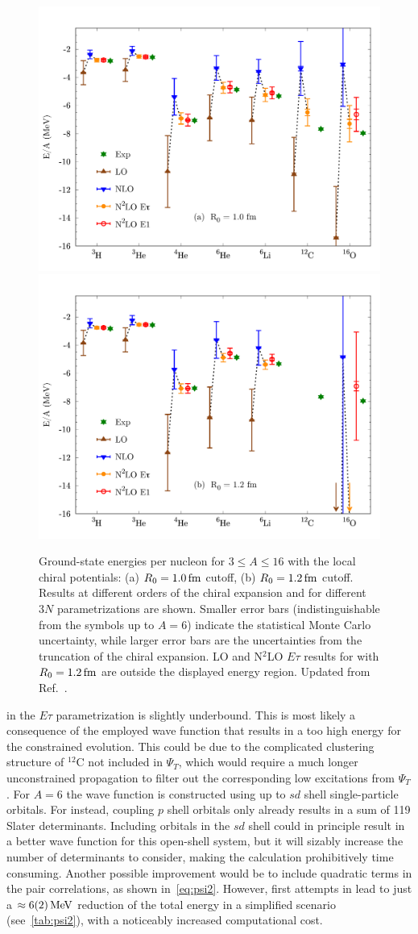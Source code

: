 \documentclass[aps,prc,twocolumn,superscriptaddress,floatfix]{revtex4-1}
\begin{document}
\begin{figure}[htb]
\includegraphics[width=0.48\linewidth]{ene_10.pdf}\qquad\includegraphics[width=0.48\linewidth]{ene_12.pdf}
\caption[]{Ground-state energies per nucleon for $3\le A\le16$ with the local chiral potentials:
(a) $R_0=1.0\,\rm fm$ cutoff, (b) $R_0=1.2\,\rm fm$ cutoff. 
Results at different orders of the chiral expansion and for different $3N$ parametrizations are shown.
Smaller error bars (indistinguishable from the symbols up to $A=6$) indicate the statistical Monte Carlo uncertainty,
while larger error bars are the uncertainties from the truncation of the chiral expansion. 
LO and N$^2$LO $E\tau$ results for  with $R_0=1.2\,\rm fm$ are outside the displayed energy region.
Updated from Ref.~\cite{Lonardoni:2017afdmc}.}
\label{fig:ene}
\end{figure}

 in the $E\tau$ parametrization is slightly underbound.
This is most likely a consequence of the employed wave function that results 
in a too high energy for the constrained evolution. 
This could be due to the complicated clustering structure of $^{12}$C not included
in $\Psi_T$, which would require a much longer unconstrained propagation
to filter out the corresponding low excitations from $\Psi_T$.
For $A=6$ the wave
function is constructed using up to $sd$ shell single-particle orbitals. For  
instead, coupling $p$ shell orbitals only
already results in a sum of 119 Slater determinants. Including orbitals in the $sd$ shell could 
in principle result in a better wave function for this open-shell system, but it will 
sizably increase the number of determinants to consider, making the calculation prohibitively 
time consuming. Another possible improvement would be to include quadratic terms in
the pair correlations, as shown in~\cref{eq:psi2}. However, first attempts in
 lead to just a $\approx6(2)\,\rm MeV$ reduction of the total 
energy in a simplified scenario (see~\cref{tab:psi2}), with a noticeably increased 
computational cost.
\end{document}
